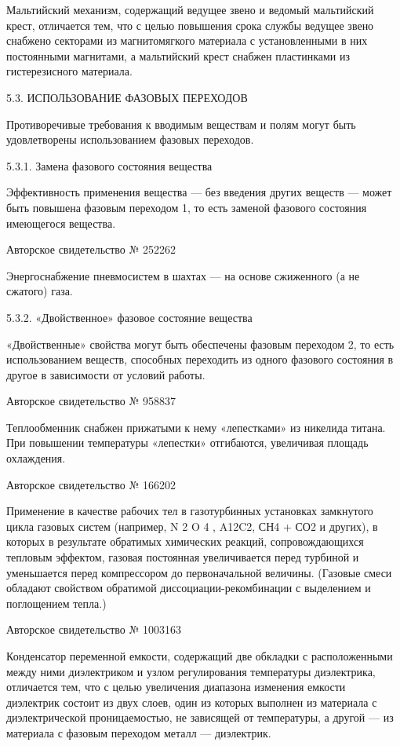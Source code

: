 Мальтийский механизм,  содержащий ведущее звено и  ведомый мальтийский
крест,  отличается тем,  что с  целью повышения  срока службы  ведущее
звено снабжено секторами из  магнитомягкого материала с установленными
в них  постоянными магнитами, а мальтийский  крест снабжен пластинками
из гистерезисного материала.

5.3. ИСПОЛЬЗОВАНИЕ ФАЗОВЫХ ПЕРЕХОДОВ


Противоречивые  требования к  вводимым  веществам и  полям могут  быть
удовлетворены использованием фазовых переходов.

5.3.1. Замена фазового состояния вещества

Эффективность  применения вещества  —  без введения  других веществ  —
может  быть повышена  фазовым переходом  1, то  есть заменой  фазового
состояния имеющегося вещества.


Авторское свидетельство № 252262

Энергоснабжение пневмосистем  в шахтах  — на  основе сжиженного  (а не
сжатого) газа.


5.3.2. «Двойственное» фазовое состояние вещества

«Двойственные» свойства могут быть  обеспечены фазовым переходом 2, то
есть использованием  веществ, способных переходить из  одного фазового
состояния в другое в зависимости от условий работы.


Авторское свидетельство № 958837

Теплообменник  снабжен  прижатыми  к  нему  «лепестками»  из  никелида
титана.  При повышении  температуры «лепестки»  отгибаются, увеличивая
площадь охлаждения.


Авторское свидетельство № 166202

Применение  в   качестве  рабочих   тел  в   газотурбинных  установках
замкнутого  цикла газовых  систем  (например, N  2 O  4  , A12C2,  СН4
+  СО2  и  других),  в   которых  в  результате  обратимых  химических
реакций,  сопровождающихся   тепловым  эффектом,   газовая  постоянная
увеличивается  перед  турбиной  и уменьшается  перед  компрессором  до
первоначальной величины.  (Газовые смеси обладают  свойством обратимой
диссоциации-рекомбинации с выделением и поглощением тепла.)

Авторское свидетельство № 1003163

Конденсатор   переменной   емкости,    содержащий   две   обкладки   с
расположенными   между  ними   диэлектриком   и  узлом   регулирования
температуры  диэлектрика,  отличается  тем,  что  с  целью  увеличения
диапазона изменения емкости диэлектрик состоит  из двух слоев, один из
которых  выполнен из  материала с  диэлектрической проницаемостью,  не
зависящей от температуры, а другой  — из материала с фазовым переходом
металл — диэлектрик.

